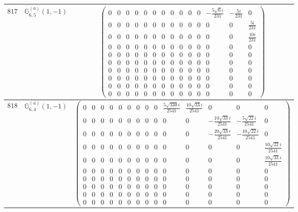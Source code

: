 \documentclass[fleqn,8pt,landscape]{jsarticle}
\begin{document}
\begin{center}
\begin{longtable}{ccc}
$ 817 $ & $ \mathbb{G}_{6,5}^{(a)}(1,-1) $ & $ \begin{pmatrix} 0 & 0 & 0 & 0 & 0 & 0 & 0 & 0 & 0 & 0 & 0 & - \frac{5 \sqrt{6} i}{231} & - \frac{5 i}{231} & 0 \\ 0 & 0 & 0 & 0 & 0 & 0 & 0 & 0 & 0 & 0 & 0 & 0 & 0 & \frac{5 i}{231} \\ 0 & 0 & 0 & 0 & 0 & 0 & 0 & 0 & 0 & 0 & 0 & 0 & 0 & \frac{10 i}{231} \\ 0 & 0 & 0 & 0 & 0 & 0 & 0 & 0 & 0 & 0 & 0 & 0 & 0 & 0 \\ 0 & 0 & 0 & 0 & 0 & 0 & 0 & 0 & 0 & 0 & 0 & 0 & 0 & 0 \\ 0 & 0 & 0 & 0 & 0 & 0 & 0 & 0 & 0 & 0 & 0 & 0 & 0 & 0 \\ 0 & 0 & 0 & 0 & 0 & 0 & 0 & 0 & 0 & 0 & 0 & 0 & 0 & 0 \\ 0 & 0 & 0 & 0 & 0 & 0 & 0 & 0 & 0 & 0 & 0 & 0 & 0 & 0 \\ 0 & 0 & 0 & 0 & 0 & 0 & 0 & 0 & 0 & 0 & 0 & 0 & 0 & 0 \\ 0 & 0 & 0 & 0 & 0 & 0 & 0 & 0 & 0 & 0 & 0 & 0 & 0 & 0 \end{pmatrix} $ \\ \hline
$ 818 $ & $ \mathbb{G}_{6,4}^{(a)}(1,-1) $ & $ \begin{pmatrix} 0 & 0 & 0 & 0 & 0 & 0 & 0 & 0 & 0 & \frac{5 \sqrt{330} i}{2541} & \frac{10 \sqrt{33} i}{2541} & 0 & 0 & 0 \\ 0 & 0 & 0 & 0 & 0 & 0 & 0 & 0 & 0 & 0 & 0 & - \frac{10 \sqrt{33} i}{2541} & - \frac{5 \sqrt{22} i}{2541} & 0 \\ 0 & 0 & 0 & 0 & 0 & 0 & 0 & 0 & 0 & 0 & 0 & - \frac{20 \sqrt{33} i}{2541} & - \frac{10 \sqrt{22} i}{2541} & 0 \\ 0 & 0 & 0 & 0 & 0 & 0 & 0 & 0 & 0 & 0 & 0 & 0 & 0 & \frac{10 \sqrt{22} i}{2541} \\ 0 & 0 & 0 & 0 & 0 & 0 & 0 & 0 & 0 & 0 & 0 & 0 & 0 & \frac{10 \sqrt{33} i}{2541} \\ 0 & 0 & 0 & 0 & 0 & 0 & 0 & 0 & 0 & 0 & 0 & 0 & 0 & 0 \\ 0 & 0 & 0 & 0 & 0 & 0 & 0 & 0 & 0 & 0 & 0 & 0 & 0 & 0 \\ 0 & 0 & 0 & 0 & 0 & 0 & 0 & 0 & 0 & 0 & 0 & 0 & 0 & 0 \\ 0 & 0 & 0 & 0 & 0 & 0 & 0 & 0 & 0 & 0 & 0 & 0 & 0 & 0 \\ 0 & 0 & 0 & 0 & 0 & 0 & 0 & 0 & 0 & 0 & 0 & 0 & 0 & 0 \end{pmatrix} $ \\ \hline

\end{longtable}
\end{center}
\end{document}
